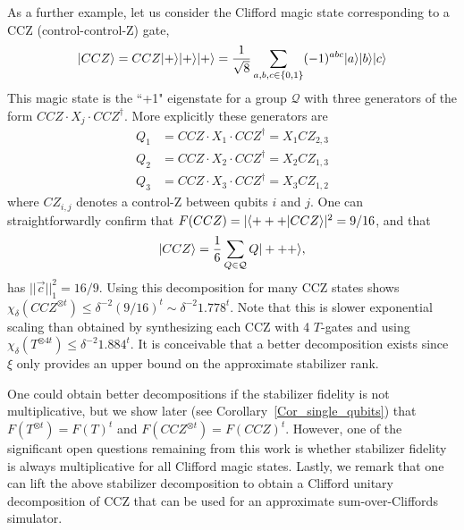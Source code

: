 As a further example, let us consider the Clifford magic state corresponding to a CCZ (control-control-Z) gate,
\begin{align}
		\vert CCZ\rangle = CCZ \vert+\rangle\vert+\rangle\vert+\rangle = \frac{1}{\sqrt{8}} \sum_{a,b,c \in \{0,1\}} (-1)^{abc} \vert a\rangle\vert b\rangle\vert c\rangle
\end{align}
This magic state is the ``+1" eigenstate for a group $\mathcal{Q}$ with three generators of the form $CCZ \cdot X_j \cdot CCZ^\dagger$.  More explicitly these generators are
\begin{align}
	Q_1   & =  CCZ \cdot X_1 \cdot CCZ^\dagger  =  X_1  CZ_{2,3} \\ \nonumber
	Q_2  & =  CCZ \cdot X_2 \cdot CCZ^\dagger  =  X_2  CZ_{1,3} \\ \nonumber
	Q_3  & =  CCZ \cdot X_3 \cdot CCZ^\dagger =  X_3  CZ_{1,2} 
\end{align}
where $CZ_{i,j}$ denotes a control-Z between qubits $i$ and $j$.  One can straightforwardly confirm that $F(CCZ)= |\langle +++\vert CCZ\rangle|^2=9/16$, and that
\begin{align}
	\label{CCZ_decomp}
	 \vert CCZ\rangle = \frac{1}{6}\sum_{Q \in \mathcal{Q}} Q\vert+++\rangle ,
\end{align}	
has $|| \vec{c} ||_1^2 = 16/9$.  Using this decomposition for many CCZ states shows $ \chi_\delta( CCZ^{\otimes t} ) \leq \delta^{-2} (9/16)^t \sim \delta^{-2} 1.778^t$.  Note that this is slower exponential scaling than obtained by synthesizing each CCZ with 4 $T$-gates and using $ \chi_\delta( T^{\otimes 4t} ) \leq \delta^{-2} 1.884^t$. It is conceivable that a better decomposition exists since $\xi$ only provides an upper bound on the approximate stabilizer rank. 

One could obtain better decompositions if the stabilizer fidelity is not multiplicative, but we show later (see Corollary~\ref{Cor_single_qubits}) that $F(T^{\otimes t})=F(T)^t$ and $F(CCZ^{\otimes t})=F(CCZ)^t$. However, one of the significant open questions remaining from this work is whether stabilizer fidelity is always multiplicative for all Clifford magic states.  Lastly, we remark that one can lift the above stabilizer decomposition to obtain a Clifford unitary decomposition of CCZ that can be used for an approximate sum-over-Cliffords simulator.

